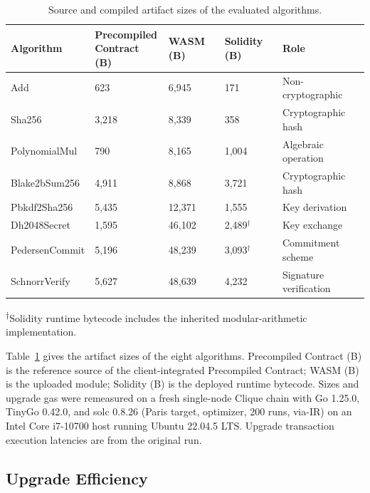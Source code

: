 \documentclass[runningheads]{llncs}
\begin{document}
\begin{table}[H]
    \centering
    \caption{Source and compiled artifact sizes of the evaluated algorithms.\label{tab:eval-algorithms}}
    \small
    \setlength{\tabcolsep}{4pt}
    \begin{tabularx}{\textwidth}{@{}llll>{\raggedright\arraybackslash}X@{}}
    \toprule
    Algorithm & \shortstack[l]{Precompiled\\Contract (B)} & WASM (B) & Solidity (B) & Role \\
    \midrule
    Add & 623 & 6{,}945 & 171 & Non-cryptographic \\
    Sha256 & 3{,}218 & 8{,}339 & 358 & Cryptographic hash \\
    PolynomialMul & 790 & 8{,}165 & 1{,}004 & Algebraic operation \\
    Blake2bSum256 & 4{,}911 & 8{,}868 & 3{,}721 & Cryptographic hash \\
    Pbkdf2Sha256 & 5{,}435 & 12{,}371 & 1{,}555 & Key derivation \\
    Dh2048Secret & 1{,}595 & 46{,}102 & 2{,}489$^{\dagger}$ & Key exchange \\
    PedersenCommit & 5{,}196 & 48{,}239 & 3{,}093$^{\dagger}$ & Commitment scheme \\
    SchnorrVerify & 5{,}627 & 48{,}639 & 4{,}232 & Signature verification \\
    \bottomrule
    \end{tabularx}
    \par\smallskip\noindent\textsuperscript{\ensuremath{\dagger}}\scriptsize Solidity runtime bytecode includes the inherited modular-arithmetic implementation.\normalsize
    \end{table}

Table~\ref{tab:eval-algorithms} gives the artifact sizes of the eight algorithms. Precompiled Contract (B) is the reference source of the client-integrated Precompiled Contract; WASM (B) is the uploaded module; Solidity (B) is the deployed runtime bytecode. Sizes and upgrade gas were remeasured on a fresh single-node Clique chain with Go 1.25.0, TinyGo 0.42.0, and solc 0.8.26 (Paris target, optimizer, 200 runs, via-IR) on an Intel Core i7-10700 host running Ubuntu 22.04.5 LTS. Upgrade transaction execution latencies are from the original run.

\subsection{Upgrade Efficiency}\label{sec5.2}
\end{document}

